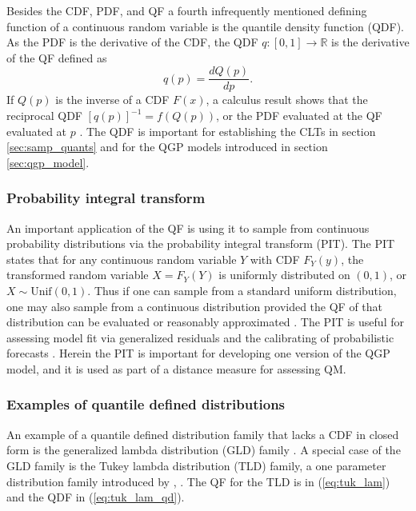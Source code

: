 \documentclass[preprint,12pt,authoryear]{elsarticle}
\newcommand{\1}[1]{\mathds{1}\left[#1\right]}
\begin{document}
Besides the CDF, PDF, and QF a  fourth infrequently mentioned defining function 
of a continuous random variable is the quantile density function (QDF). As the 
PDF is the derivative of the CDF, the QDF $q:[0,1] \rightarrow \mathbb{R}$ is 
the derivative of the QF defined as
\[
    q(p) = \frac{dQ(p)}{dp}.
\]
If $Q(p)$ is the inverse of a CDF $F(x)$, a calculus result shows that the 
reciprocal QDF $[q(p)]^{-1} = f(Q(p))$, or the PDF evaluated at the QF 
evaluated at $p$ 
\cite[]{perepolkin2023tenets, gilchrist2000statistical}. The QDF is important 
for establishing the CLTs in section \ref{sec:samp_quants} and for the QGP 
models introduced in section \ref{sec:qgp_model}.

\subsubsection{Probability integral transform}
An important application of the QF is using it to sample from continuous 
probability distributions via the probability integral transform (PIT). The 
PIT states that for any continuous random variable $Y$ with CDF $F_Y(y)$, the 
transformed random variable $X = F_Y(Y)$ is uniformly distributed on $(0,1)$, 
or $X \sim \text{Unif}(0,1)$. Thus if one can sample from a standard uniform 
distribution, one may also sample from a continuous distribution provided the 
QF of that distribution can be evaluated or reasonably approximated 
\cite[]{wilkinson2018stochastic}. The PIT is useful for assessing model fit via 
generalized residuals \cite[]{yang2024double, cox1968general} and the 
calibrating of probabilistic forecasts \cite[]{gneiting2007probabilistic}. 
Herein the PIT is important for developing one version of the QGP model, and it 
is used as part of a distance measure for assessing QM.

\subsubsection{Examples of quantile defined distributions} \label{sec:quant_def_dist}

An example of a quantile defined distribution family that lacks a CDF in closed 
form is the generalized lambda distribution (GLD) family 
\cite[]{ramberg1974approximate, perepolkin2023tenets}. A special case of the 
GLD family is the Tukey lambda distribution (TLD) family, a one parameter 
distribution family introduced by \cite{tukey1960practical}, 
\cite[]{joiner1971some}. The QF for the TLD is in (\ref{eq:tuk_lam}) and the 
QDF in (\ref{eq:tuk_lam_qd}).   
\end{document}
